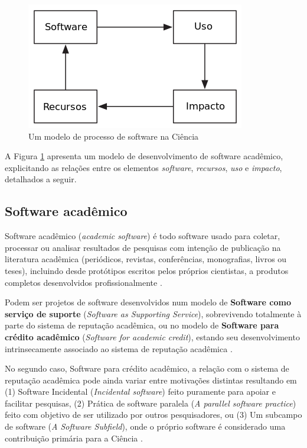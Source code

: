 \begin{figure}[h]
  \center
  \includegraphics[scale=0.5]{imagens/process-model-scientific-software-dia.png}
  \caption{Um modelo de processo de software na Ciência~\cite{howison2015understanding}}
  \label{process-model-scientific-software}
\end{figure}

A Figura \ref{process-model-scientific-software} apresenta um modelo de
desenvolvimento de software acadêmico, explicitando as relações entre os
elementos \textit{software}, \textit{recursos}, \textit{uso} e
\textit{impacto}, detalhados a seguir.

\subsection{Software acadêmico}

Software acadêmico ({\it academic software}) é todo software usado para
coletar, processar ou analisar resultados de pesquisas com intenção de
publicação na literatura acadêmica (periódicos, revistas, conferências,
monografias, livros ou teses), incluindo desde protótipos escritos pelos
próprios cientistas, a produtos completos desenvolvidos profissionalmente
\cite{allen2017engineering}.

Podem ser projetos de software desenvolvidos num modelo de {\bf Software como
serviço de suporte} ({\it Software as Supporting Service}), sobrevivendo
totalmente à parte do sistema de reputação acadêmica, ou no modelo de {\bf
Software para crédito acadêmico} ({\it Software for academic credit}), estando
seu desenvolvimento intrinsecamente associado ao sistema de reputação acadêmica
\cite{howison2011scientific}.

No segundo caso, Software para crédito acadêmico, a relação com o sistema de
reputação acadêmica pode ainda variar entre motivações distintas resultando em
(1) Software Incidental ({\it Incidental software})
feito puramente para apoiar e facilitar pesquisas,
(2) Prática de software paralela ({\it A parallel software practice})
feito com objetivo de ser utilizado por outros pesquisadores, ou
(3) Um subcampo de software ({\it A Software Subfield}),
onde o próprio software é considerado uma contribuição primária para a Ciência
\cite{howison2011scientific}.

